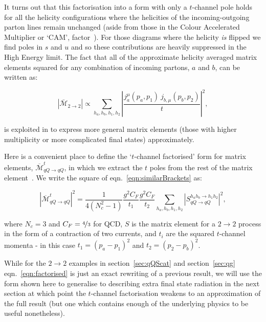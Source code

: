 		It turns out that this factorisation into a form with only a $t$-channel pole holds for
		all the helicity configurations where the helicities of the incoming-outgoing parton lines
		remain unchanged (aside from those in the Colour Accelerated Multiplier or `CAM',
		factor~\cite{Andersen:2009he}).  For those diagrams where the helicity \emph{is} flipped we find poles
		in $s$ and $u$ and so these contributions are heavily suppressed in the High Energy limit.
		The fact that all of the approximate helicity averaged matrix elements squared for any
		combination of incoming partons, $a$ and $b$, can be written as:

		\begin{equation}
			|\bar{\mathcal{M}}_{2\to2}| \propto \sum_{h_a, h_b, h_1, h_2}
			\left|\frac{j^\mu_a(p_a, p_1)\ j_{b, \mu}(p_b, p_2)}{t}\right|^2,
		\end{equation}

		is exploited in \hej to express more general matrix elements (those with higher multiplicity or
		more complicated final states) approximately.

		Here is a convenient place to define the `$t$-channel factorised' form for matrix elements,
		$\overline{\mathcal{M}}^t_{qQ\rightarrow qQ}$, in which we extract the $t$ poles from the
		rest of the matrix element~\cite{Andersen:2009nu}.  We write the square of
		eqn.~\eqref{eqn:similarBrackets} as:

		\begin{equation}
			|\overline{\mathcal{M}}^t_{qQ\rightarrow qQ}|^2 = \frac{1}{4(N_c^2-1)}
			\frac{g^2C_F}{t_1}\frac{g^2C_F}{t_2} \sum_{h_a, h_b, h_1, h_2}
			|S_{qQ\rightarrow qQ}^{h_ah_b\rightarrow h_1h_2}|^2,
			\label{eqn:factorised}
		\end{equation}

		where $N_c=3$ and $C_F=\nicefrac{4}{3}$ for QCD, $S$ is the matrix element for a $2\rightarrow2$ process
		in the form of a contraction of two currents, and $t_i$ are the squared $t$-channel momenta - in this
		case $t_1=(p_a-p_1)^2$ and $t_2=(p_2-p_b)^2$.

		While for the $2\to2$ examples in section~\eqref{sec:qQScat} and section~\eqref{sec:qg} eqn.~\eqref{eqn:factorised}
		is just an exact rewriting of a previous result, we will use the form shown here to generalise to describing
		extra final state radiation in the next section at which point the $t$-channel factorisation weakens to
		an approximation of the full result (but one which contains enough of the underlying physics to be useful
		nonetheless).

